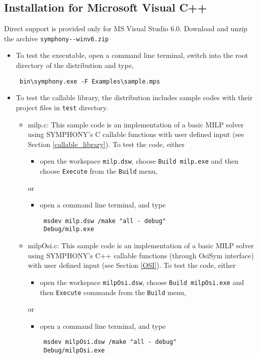 \subsection{Installation for Microsoft Visual C++}
Direct support is provided only for MS Visual Studio 6.0. 
Download and unzip the archive \texttt{symphony-\VER-winv6.zip} 
\begin{itemize}
\item To test the executable, open a command line terminal,  
switch into the root directory of the distribution and type, 
{\color{Brown}
\begin{verbatim}
 bin\symphony.exe -F Examples\sample.mps
 \end{verbatim}
}
\item To test the callable library, the distribution includes sample codes with
their project files in \texttt{test} directory. 
\begin{itemize}
\item milp.c: This sample code is an implementation of a basic MILP solver 
using SYMPHONY's C callable functions with user defined input 
(see Section \ref{callable_library}). 
To test the code, either 

\begin{itemize}
\item open the workspace \texttt{milp.dsw}, choose \texttt{Build milp.exe}
and then choose \texttt{Execute} from the \texttt{Build} menu, 
\end{itemize}
or
\begin{itemize}
\item open a command line terminal, and type 
{\color{Brown}
\begin{verbatim}
 msdev milp.dsw /make "all - debug"
 Debug/milp.exe
 \end{verbatim}
}
\end{itemize}
\item  milpOsi.c: This sample code is an implementation of a basic MILP 
solver using SYMPHONY's C++ callable functions (through OsiSym interface)
with user defined input (see Section \ref{OSI}). To test the code, either 
\begin{itemize}
\item open the workspace \texttt{milpOsi.dsw}, 
choose \texttt{Build milpOsi.exe} and then 
\texttt{Execute} commands from the \texttt{Build} menu, 
\end{itemize}
or
\begin{itemize}
\item open a command line terminal, and type 
{\color{Brown}
\begin{verbatim}
 msdev milpOsi.dsw /make "all - debug"
 Debug/milpOsi.exe
 \end{verbatim}
}
\end{itemize}
\end{itemize}
\end{itemize}
